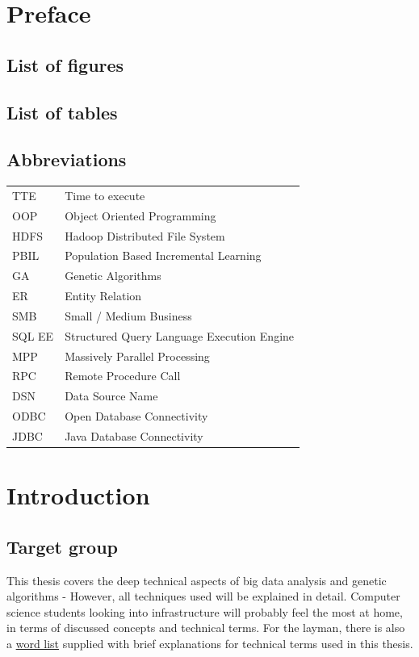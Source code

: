 \documentclass[a4paper,english]{report}
\begin{document}
	\chapter{Preface}
	\section{List of figures}
	\section{List of tables}
	\section{Abbreviations}
	\label{word_list}
	\begin{table}[h]
		\centering
		\begin{tabular}{ll}
			TTE	& Time to execute \\
			OOP	& Object Oriented Programming \\
			HDFS & Hadoop Distributed File System \\
			PBIL & Population Based Incremental Learning \\
			GA & Genetic Algorithms \\
			ER & Entity Relation \\
			SMB & Small / Medium Business \\
			SQL EE & Structured Query Language Execution Engine \\
			MPP & Massively Parallel Processing \\
			RPC & Remote Procedure Call \\
			DSN & Data Source Name \\
			ODBC & Open Database Connectivity \\
			JDBC & Java Database Connectivity \\
		\end{tabular}
	\end{table}

	
	\chapter{Introduction}
		
		\section{Target group}
		This thesis covers the deep technical aspects of big data analysis and genetic algorithms - However, all techniques used will be explained in detail. Computer science students looking into infrastructure will probably feel the most at home, in terms of discussed concepts and technical terms. For the layman, there is also a \hyperref[word_list]{word list} supplied with brief explanations for technical terms used in this thesis.
		
\end{document}
